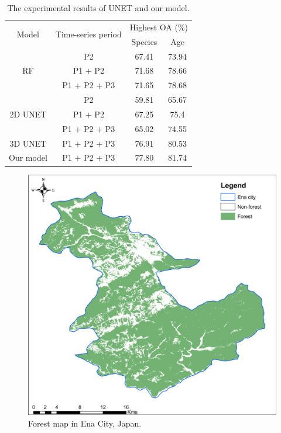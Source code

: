 \begin{table}[tbh!]
    \centering
    \caption{The experimental results of UNET and our model.}
    \begin{tabular}{cccc}
    \hline
        \multirow{2}{*}{Model} & \multirow{2}{*}{Time-series period} & \multicolumn{2}{c}{Highest OA (\%)} \\ \cline{3-4}
        ~ & ~ & Species & Age \\ \hline
        \multirow{3}{*}{RF} & P2 & 67.41 & 73.94 \\ 
        ~ & P1 + P2 & 71.68 & 78.66 \\ 
        ~ & P1 + P2 + P3 & 71.65 & 78.68 \\ \hline
        \multirow{3}{*}{2D UNET} & P2 & 59.81 & 65.67 \\ 
        ~ & P1 + P2 & 67.25 & 75.4 \\ 
        ~ & P1 + P2 + P3 & 65.02 & 74.55 \\ \hline
        3D UNET & P1 + P2 + P3 & 76.91 & 80.53 \\ 
        Our model & P1 + P2 + P3 & 77.80 & 81.74 \\ \hline
    \end{tabular}
    \label{tab:chap5_tab2}
\end{table}


\begin{figure}[tbh!]
    \centering
    \includegraphics[width=\textwidth]{figs/chap5/Forest.png}
    \caption{Forest map in Ena City, Japan.}
    \label{fig:chap5_fig3}
    
\end{figure}

